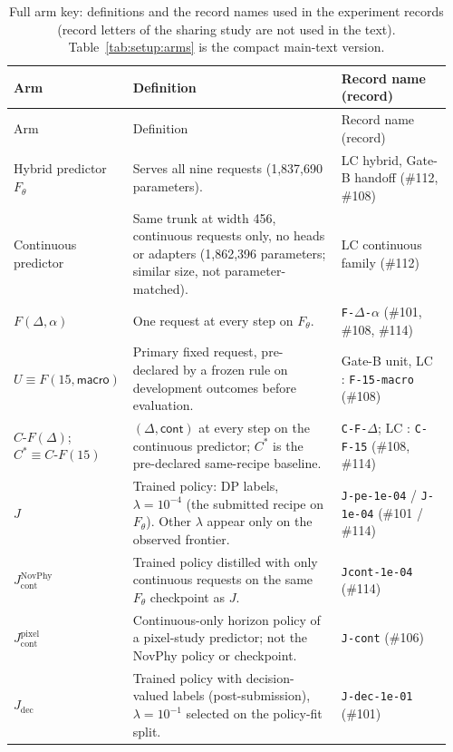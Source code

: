 \begingroup
\ifshowrevisions\color{blue}\fi
\footnotesize
\setlength{\tabcolsep}{3pt}
\begin{longtable}{@{}>{\raggedright\arraybackslash}p{0.2\linewidth}>{\raggedright\arraybackslash}p{0.5\linewidth}>{\raggedright\arraybackslash}p{0.26\linewidth}@{}}
\caption{Full arm key: definitions and the record names used in the experiment records (record letters of the sharing study are not used in the text). Table~\ref{tab:setup:arms} is the compact main-text version.}\label{tab:app:arms}\\
\toprule
Arm & Definition & Record name (record) \\
\midrule
\endfirsthead
\toprule
Arm & Definition & Record name (record) \\
\midrule
\endhead
\bottomrule
\endlastfoot
Hybrid predictor $F_\theta$ & Serves all nine requests (1,837,690 parameters). & LC hybrid, Gate-B handoff (\#112, \#108) \\
Continuous predictor & Same trunk at width 456, continuous requests only, no heads or adapters (1,862,396 parameters; similar size, not parameter-matched). & LC continuous family (\#112) \\
$F(\Delta,\alpha)$ & One request at every step on $F_\theta$. & \texttt{F-}$\Delta$\texttt{-}$\alpha$ (\#101, \#108, \#114) \\
$U\equiv F(15,\textsf{macro})$ & Primary fixed request, pre-declared by a frozen rule on development outcomes before evaluation. & Gate-B unit, LC : \texttt{F-15-macro} (\#108) \\
$C\text{-}F(\Delta)$; $C^*\equiv C\text{-}F(15)$ & $(\Delta,\textsf{cont})$ at every step on the continuous predictor; $C^*$ is the pre-declared same-recipe baseline. & \texttt{C-F-}$\Delta$; LC : \texttt{C-F-15} (\#108, \#114) \\
$J$ & Trained policy: DP labels, $\lambda=10^{-4}$ (the submitted recipe on $F_\theta$). Other $\lambda$ appear only on the observed frontier. & \texttt{J-pe-1e-04} / \texttt{J-1e-04} (\#101 / \#114) \\
$J_{\mathrm{cont}}^{\mathrm{NovPhy}}$ & Trained policy distilled with only continuous requests on the same $F_\theta$ checkpoint as $J$. & \texttt{Jcont-1e-04} (\#114) \\
$J_{\mathrm{cont}}^{\mathrm{pixel}}$ & Continuous-only horizon policy of a pixel-study predictor; not the NovPhy policy or checkpoint. & \texttt{J-cont} (\#106) \\
$J_{\mathrm{dec}}$ & Trained policy with decision-valued labels (post-submission), $\lambda=10^{-1}$ selected on the policy-fit split. & \texttt{J-dec-1e-01} (\#101) \\

\end{longtable}
